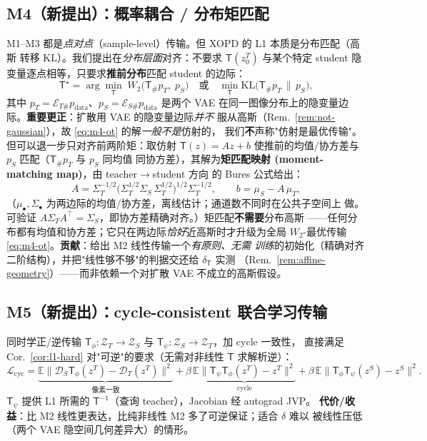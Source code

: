 \documentclass[11pt,a4paper]{article}
\newcommand{\loss}{\mathcal{L}}
\newcommand{\E}{\mathbb{E}}
\newcommand{\KL}{\mathrm{KL}}
\newcommand{\Enc}{\mathcal{E}}
\newcommand{\Dec}{\mathcal{D}}
\newcommand{\Zt}{\mathcal{Z}_T}
\newcommand{\Zs}{\mathcal{Z}_S}
\newcommand{\Tmap}{\mathsf{T}}
\newcommand{\push}{\#}
\theoremstyle{definition}
\begin{document}
\subsection{M4（新提出）：概率耦合 / 分布矩匹配}

M1--M3 都是\emph{点对点}（sample-level）传输。但 XOPD 的 L1 本质是分布匹配（高斯
转移 KL）。我们提出在\emph{分布层面}对齐：不要求 $\Tmap(z_0^T)$ 与某个特定 student
隐变量逐点相等，只要求\textbf{推前分布}匹配 student 的边际：
\begin{equation}
\Tmap^\star=\arg\min_{\Tmap}\;
W_2\big(\Tmap_\push p_T,\;p_S\big)
\quad\text{或}\quad
\min_\Tmap \KL\big(\Tmap_\push p_T\,\|\,p_S\big),
\label{eq:m4-ot}
\end{equation}
其中 $p_T=\Enc_{T\push}p_{\mathrm{data}}$、$p_S=\Enc_{S\push}p_{\mathrm{data}}$ 是两个
VAE 在同一图像分布上的隐变量边际。\textbf{重要更正}：扩散用 VAE 的隐变量边际\emph{并不}
服从高斯（Rem.~\ref{rem:not-gaussian}），故 \eqref{eq:m4-ot} 的解\emph{一般不是}仿射的，
我们\textbf{不}声称"仿射是最优传输"。但可以退一步只对齐前两阶矩：取仿射
$\Tmap(z)=Az+b$ 使推前的均值/协方差与 $p_S$ 匹配（$\Tmap_\push p_T$ 与 $p_S$ 同均值
同协方差），其解为\textbf{矩匹配映射 (moment-matching map)}，由 teacher$\to$student 方向
的 Bures 公式给出：
\begin{equation}
A=\Sigma_T^{-1/2}\big(\Sigma_T^{1/2}\Sigma_S\,\Sigma_T^{1/2}\big)^{1/2}\Sigma_T^{-1/2},
\qquad
b=\mu_S-A\,\mu_T,
\label{eq:gaussian-ot}
\end{equation}
（$\mu_\bullet,\Sigma_\bullet$ 为两边际的均值/协方差，离线估计；通道数不同时在公共子空间上
做。可验证 $A\Sigma_T A^\top=\Sigma_S$，即协方差精确对齐。）矩匹配\textbf{不需要}分布高斯
——任何分布都有均值和协方差；它只在两边际\emph{恰好}近高斯时才升级为全局
$W_2$-最优传输 \eqref{eq:m4-ot}。\textbf{贡献}：给出 M2 线性传输一个\emph{有原则、无需
训练}的初始化（精确对齐二阶结构），并把"线性够不够"的判据交还给 $\delta_{\Tmap}$ 实测
（Rem.~\ref{rem:affine-geometry}）——而非依赖一个对扩散 VAE 不成立的高斯假设。

\subsection{M5（新提出）：cycle-consistent 联合学习传输}

同时学正/逆传输 $\Tmap_\phi:\Zt\to\Zs$ 与 $\Tmap_\psi:\Zs\to\Zt$，加 cycle 一致性，
直接满足 Cor.~\ref{cor:l1-hard} 对"可逆"的要求（无需对非线性 $\Tmap$ 求解析逆）：
\begin{equation}
\loss_{\mathrm{cyc}}
=\underbrace{\E\lVert \Dec_S\Tmap_\phi(z^T)-\Dec_T(z^T)\rVert^2}_{\text{像素一致}}
+\beta\,\underbrace{\E\lVert \Tmap_\psi\Tmap_\phi(z^T)-z^T\rVert^2}_{\text{cycle}}
+\beta\,\E\lVert \Tmap_\phi\Tmap_\psi(z^S)-z^S\rVert^2 .
\label{eq:m5}
\end{equation}
$\Tmap_\psi$ 提供 L1 所需的 $\Tmap^{-1}$（查询 teacher），Jacobian 经 autograd JVP。
\textbf{代价/收益}：比 M2 线性更表达，比纯非线性 M2 多了可逆保证；适合 $\delta$ 难以
被线性压低（两个 VAE 隐空间几何差异大）的情形。
\end{document}

